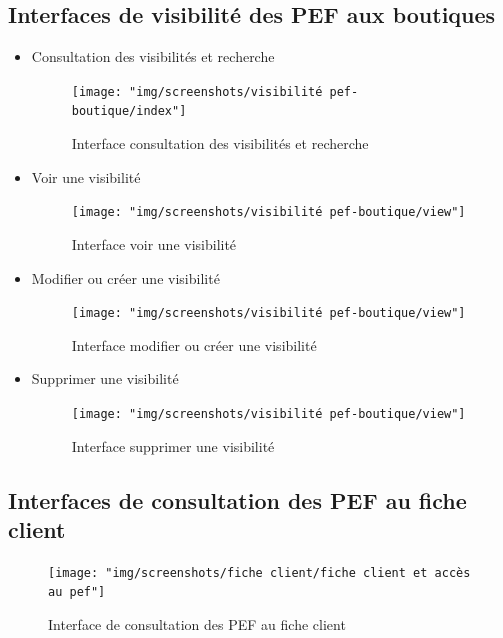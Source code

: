 \subsection{Interfaces de visibilité des PEF aux boutiques}
\begin{itemize}
	\item Consultation des visibilités et recherche
	\begin{figure}[H]
		\centering
		\texttt{[image: "img/screenshots/visibilité pef-boutique/index"]}
		\caption[Interface consultation des visibilités et recherche]{Interface consultation des visibilités et recherche}
		\label{fig:index-visib}
	\end{figure}
	
	\item Voir une visibilité 
	\begin{figure}[H]
		\centering
		\texttt{[image: "img/screenshots/visibilité pef-boutique/view"]}
		\caption[Interface voir une visibilité]{Interface voir une visibilité }
		\label{fig:view-visib}
	\end{figure}

	\item Modifier ou créer une visibilité 
	\begin{figure}[H]
		\centering
		\texttt{[image: "img/screenshots/visibilité pef-boutique/view"]}
		\caption[Interface modifier ou créer une visibilité]{Interface modifier ou créer une visibilité}
		\label{fig:edit-visib}
	\end{figure}

	\item Supprimer une visibilité 
	\begin{figure}[H]
		\centering
		\texttt{[image: "img/screenshots/visibilité pef-boutique/view"]}
		\caption[Interface supprimer une visibilité]{Interface supprimer une visibilité}
		\label{fig:delete-visib}
	\end{figure}
	
\end{itemize}
\subsection{Interfaces de consultation des PEF au fiche client}
\begin{figure}[H]
	\centering
	\texttt{[image: "img/screenshots/fiche client/fiche client et accès au pef"]}
	\caption[Interface de consultation des PEF au fiche client]{Interface de consultation des PEF au fiche client}
	\label{fig:fiche-client-et-acces-au-pef}
\end{figure}

